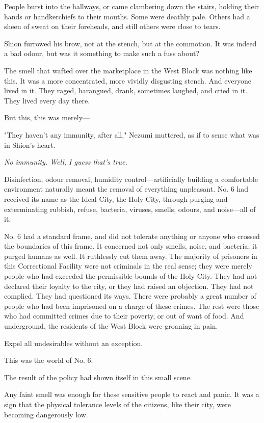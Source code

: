 People burst into the hallways, or came clambering down the stairs,
holding their hands or handkerchiefs to their mouths. Some were deathly
pale. Others had a sheen of sweat on their foreheads, and still others
were close to tears.

Shion furrowed his brow, not at the stench, but at the commotion. It was
indeed a bad odour, but was it something to make such a fuss about?

The smell that wafted over the marketplace in the West Block was nothing
like this. It was a more concentrated, more vividly disgusting stench.
And everyone lived in it. They raged, harangued, drank, sometimes
laughed, and cried in it. They lived every day there.

But this, this was merely---

"They haven't any immunity, after all," Nezumi muttered, as if to sense
what was in Shion's heart.

\emph{No immunity. Well, I guess that's true.}

Disinfection, odour removal, humidity control---artificially building a
comfortable environment naturally meant the removal of everything
unpleasant. No. 6 had received its name as the Ideal City, the Holy
City, through purging and exterminating rubbish, refuse, bacteria,
viruses, smells, odours, and noise---all of it.

No. 6 had a standard frame, and did not tolerate anything or anyone who
crossed the boundaries of this frame. It concerned not only smells,
noise, and bacteria; it purged humans as well. It ruthlessly cut them
away. The majority of prisoners in this Correctional Facility were not
criminals in the real sense; they were merely people who had exceeded
the permissible bounds of the Holy City. They had not declared their
loyalty to the city, or they had raised an objection. They had not
complied. They had questioned its ways. There were probably a great
number of people who had been imprisoned on a charge of these crimes.
The rest were those who had committed crimes due to their poverty, or
out of want of food. And underground, the residents of the West Block
were groaning in pain.

Expel all undesirables without an exception.

This was the world of No. 6.

The result of the policy had shown itself in this small scene.

Any faint smell was enough for these sensitive people to react and
panic. It was a sign that the physical tolerance levels of the citizens,
like their city, were becoming dangerously low.

